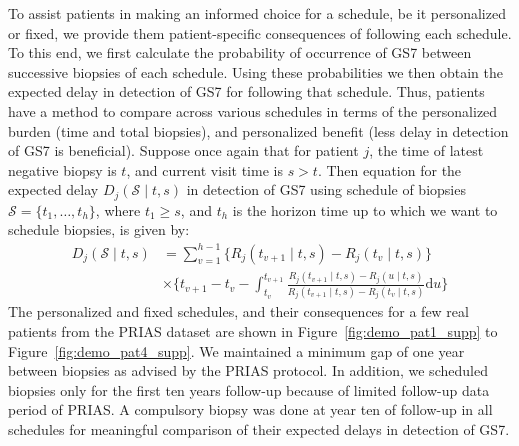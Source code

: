 To assist patients in making an informed choice for a schedule, be it personalized or fixed, we provide them patient-specific consequences of following each schedule. To this end, we first calculate the probability of occurrence of GS7 between successive biopsies of each schedule. Using these probabilities we then obtain the expected delay in detection of GS7 for following that schedule. Thus, patients have a method to compare across various schedules in terms of the personalized burden (time and total biopsies), and personalized benefit (less delay in detection of GS7 is beneficial). Suppose once again that for patient $j$, the time of latest negative biopsy is $t$, and current visit time is $s > t$. Then equation for the expected delay $D_j(\mathcal{S} \mid t,s)$ in detection of GS7 using schedule of biopsies $\mathcal{S} = \{t_1, \ldots, t_h\}$, where $t_1 \geq s$, and $t_h$ is the horizon time up to which we want to schedule biopsies, is given by:
\begin{equation}
\label{eq:expected_delay}
\begin{split}
D_j(\mathcal{S} \mid t,s) &= \sum_{v=1}^{h-1} \Big\{R_j(t_{v+1}\mid t,s) - R_j(t_v\mid t,s)\Big\} \\ & \times  \Bigg\{t_{v+1} - t_{v} - \int_{t_v}^{t_{v+1}} \frac{R_j(t_{v+1}\mid t,s)-R_j(u \mid t,s)}{R_j(t_{v+1}\mid t,s) - R_j(t_v\mid t,s)} \mathrm{d}u \Bigg\}
\end{split}
\end{equation}
The personalized and fixed schedules, and their consequences for a few real patients from the PRIAS dataset are shown in Figure~\ref{fig:demo_pat1_supp} to Figure~\ref{fig:demo_pat4_supp}. We maintained a minimum gap of one year between biopsies as advised by the PRIAS protocol. In addition, we scheduled biopsies only for the first ten years follow-up because of limited follow-up data period of PRIAS. A compulsory biopsy was done at year ten of follow-up in all schedules for meaningful comparison of their expected delays in detection of GS7.

